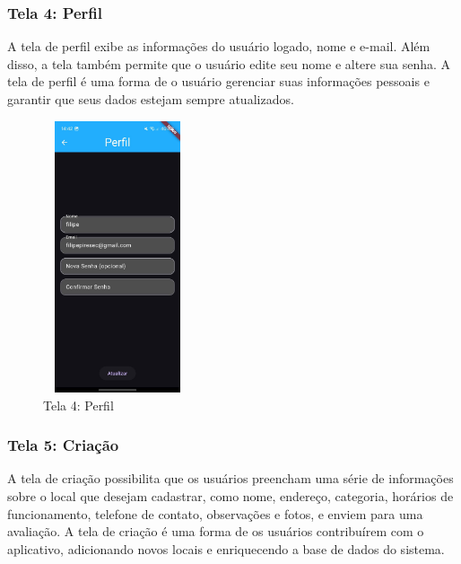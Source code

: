     \FloatBarrier

\subsubsection{Tela 4: Perfil}

    A tela de perfil exibe as informações do usuário logado, nome e e-mail. Além disso, a tela também permite que o usuário edite seu nome e altere sua senha. A tela de perfil é uma forma de o usuário gerenciar suas informações pessoais e garantir que seus dados estejam sempre atualizados.

    \begin{figure}[h]
        \centering
        \includegraphics[width=44mm,height=80mm]{imagens/perfil.jpg}
        \caption{\scriptsize Tela 4: Perfil}
        \footnotesize  {}
        \label{fig:tela4}
    \end{figure}

    \FloatBarrier

\subsubsection{Tela 5: Criação}

    A tela de criação possibilita que os usuários preencham uma série de informações sobre o local que desejam cadastrar, como nome, endereço, categoria, horários de funcionamento, telefone de contato, observações e fotos, e enviem para uma avaliação. A tela de criação é uma forma de os usuários contribuírem com o aplicativo, adicionando novos locais e enriquecendo a base de dados do sistema.

